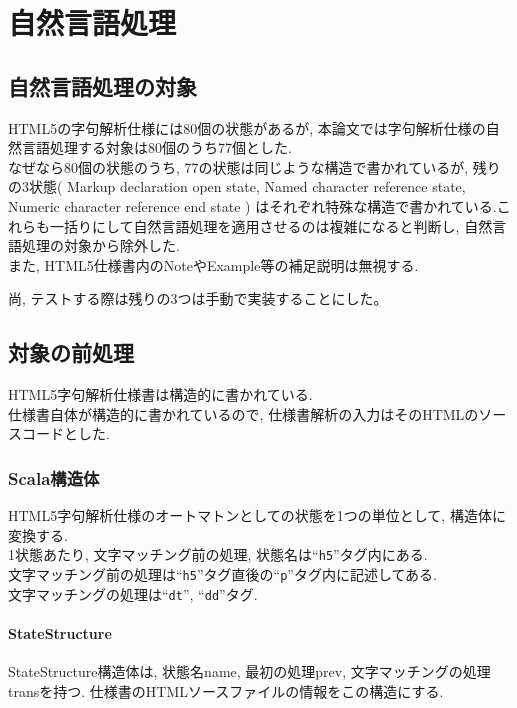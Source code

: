 \documentclass[uplatex,a4j]{jsreport}
\begin{document}
\chapter{自然言語処理}
\label{自然言語処理}
\section{自然言語処理の対象}
HTML5の字句解析仕様には80個の状態があるが, 本論文では字句解析仕様の自然言語処理する対象は80個のうち77個とした.\\
なぜなら80個の状態のうち, 77の状態は同じような構造で書かれているが,
残りの3状態(
Markup declaration open state, 
Named character reference state, 
Numeric character reference end state
)
はそれぞれ特殊な構造で書かれている.これらも一括りにして自然言語処理を適用させるのは複雑になると判断し, 自然言語処理の対象から除外した.
\\
また, HTML5仕様書内のNoteやExample等の補足説明は無視する.

尚, テストする際は残りの3つは手動で実装することにした。


\section{対象の前処理}
HTML5字句解析仕様書は構造的に書かれている. \\
仕様書自体が構造的に書かれているので, 
仕様書解析の入力はそのHTMLのソースコードとした. \\

\subsection{Scala構造体}
HTML5字句解析仕様のオートマトンとしての状態を1つの単位として, 構造体に変換する.\\%
1状態あたり, 文字マッチング前の処理, 
状態名は``\texttt{h5}''タグ内にある.\\
文字マッチング前の処理は``\texttt{h5}''タグ直後の``\texttt{p}''タグ内に記述してある.\\
文字マッチングの処理は``\texttt{dt}'', ``\texttt{dd}''タグ.
\subsubsection{StateStructure}
StateStructure構造体は, 状態名name, 最初の処理prev, 文字マッチングの処理transを持つ.
仕様書のHTMLソースファイルの情報をこの構造にする.
\end{document}
